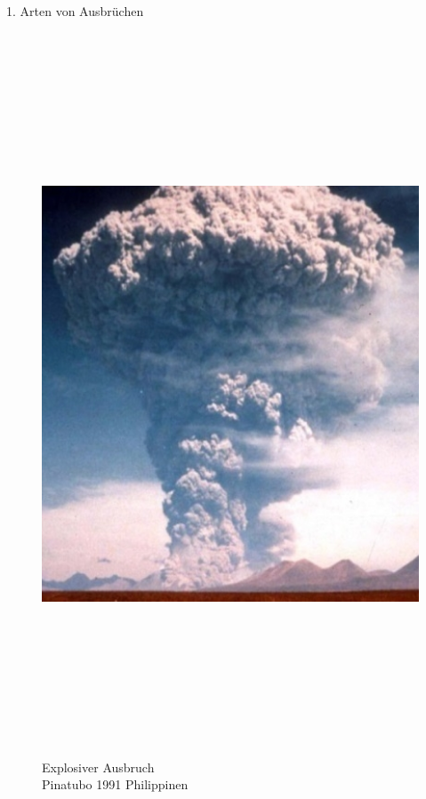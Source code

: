 \documentclass[xcolor=dvipsnames]{beamer}
\begin{document}
\begin{frame}[t]{}
\begin{block}{\LARGE 1. Arten von Ausbrüchen}
\begin{minipage}[t]{0.3\textwidth}
\begin{figure}
    \includegraphics[width=20.5cm, height=21.5cm]{images/3.jpg}
      \caption{\Large Explosiver Ausbruch\\ Pinatubo 1991 Philippinen}
    \end{figure}
    \end{minipage}
  \end{block}
  

\end{frame}
\end{document}
